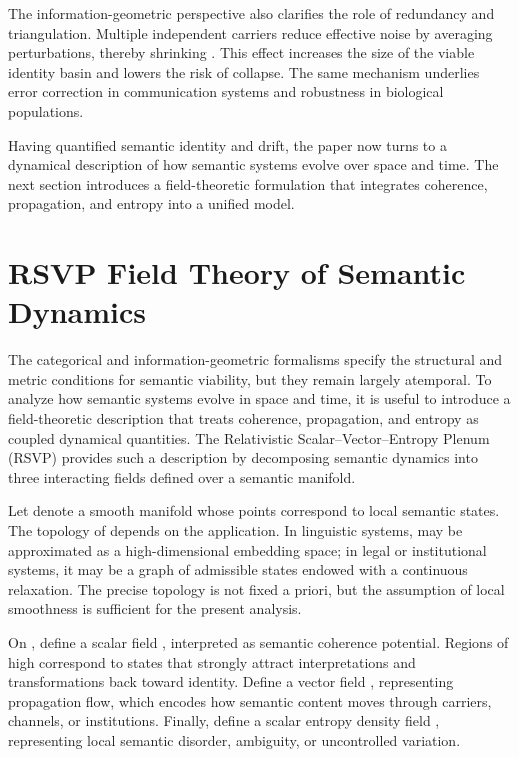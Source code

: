 \documentclass[11pt,oneside]{article}
\begin{document}
The information-geometric perspective also clarifies the role of redundancy and triangulation. Multiple independent carriers reduce effective noise by averaging perturbations, thereby shrinking . This effect increases the size of the viable identity basin and lowers the risk of collapse. The same mechanism underlies error correction in communication systems and robustness in biological populations.

Having quantified semantic identity and drift, the paper now turns to a dynamical description of how semantic systems evolve over space and time. The next section introduces a field-theoretic formulation that integrates coherence, propagation, and entropy into a unified model.



\section{RSVP Field Theory of Semantic Dynamics} 

The categorical and information-geometric formalisms specify the structural and metric conditions for semantic viability, but they remain largely atemporal. To analyze how semantic systems evolve in space and time, it is useful to introduce a field-theoretic description that treats coherence, propagation, and entropy as coupled dynamical quantities. The Relativistic Scalar–Vector–Entropy Plenum (RSVP) provides such a description by decomposing semantic dynamics into three interacting fields defined over a semantic manifold.

Let denote a smooth manifold whose points correspond to local semantic states. The topology of depends on the application. In linguistic systems, may be approximated as a high-dimensional embedding space; in legal or institutional systems, it may be a graph of admissible states endowed with a continuous relaxation. The precise topology is not fixed a priori, but the assumption of local smoothness is sufficient for the present analysis.

On , define a scalar field , interpreted as semantic coherence potential. Regions of high correspond to states that strongly attract interpretations and transformations back toward identity. Define a vector field , representing propagation flow, which encodes how semantic content moves through carriers, channels, or institutions. Finally, define a scalar entropy density field , representing local semantic disorder, ambiguity, or uncontrolled variation.
\end{document}
